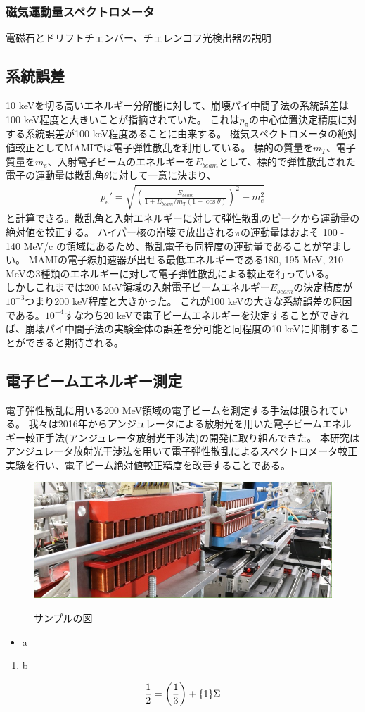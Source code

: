 \documentclass[a4paper,11pt,uplatex]{jsarticle}
\begin{document}
\subsubsection{磁気運動量スペクトロメータ}
電磁石とドリフトチェンバー、チェレンコフ光検出器の説明
\subsection{系統誤差}
10 keVを切る高いエネルギー分解能に対して、崩壊パイ中間子法の系統誤差は100 keV程度と大きいことが指摘されていた。
これは$p_\pi$の中心位置決定精度に対する系統誤差が100 keV程度あることに由来する。
磁気スペクトロメータの絶対値較正としてMAMIでは電子弾性散乱を利用している。
標的の質量を$m_T$、電子質量を$m_e$、入射電子ビームのエネルギーを$E_{beam}$として、標的で弾性散乱された電子の運動量は散乱角$\theta$に対して一意に決まり、
\begin{eqnarray}
  p_e' = \sqrt{\left(\frac{E_{beam}}{1 + E_{beam}/m_T(1 - \cos{\theta})} \right)^2 - m_e^2}
\end{eqnarray}
と計算できる。散乱角と入射エネルギーに対して弾性散乱のピークから運動量の絶対値を較正する。
ハイパー核の崩壊で放出される$\pi$の運動量はおよそ 100 - 140 MeV/c の領域にあるため、散乱電子も同程度の運動量であることが望ましい。
MAMIの電子線加速器が出せる最低エネルギーである180, 195 MeV, 210 MeVの3種類のエネルギーに対して電子弾性散乱による較正を行っている。\\
しかしこれまでは200 MeV領域の入射電子ビームエネルギー$E_{beam}$の決定精度が$10^{-3}$つまり200 keV程度と大きかった。
これが100 keVの大きな系統誤差の原因である。$10^{-4}$すなわち$20$ keVで電子ビームエネルギーを決定することができれば、崩壊パイ中間子法の実験全体の誤差を分可能と同程度の10 keVに抑制することができると期待される。
\subsection{電子ビームエネルギー測定}
電子弾性散乱に用いる200 MeV領域の電子ビームを測定する手法は限られている。
我々は2016年からアンジュレータによる放射光を用いた電子ビームエネルギー較正手法(アンジュレータ放射光干渉法)の開発に取り組んできた。
本研究はアンジュレータ放射光干渉法を用いて電子弾性散乱によるスペクトロメータ較正実験を行い、電子ビーム絶対値較正精度を改善することである。

\clearpage

\begin{figure}[tb]
  \centering
  \includegraphics[width=0.8\linewidth]{image/1-1.jpg}\\
  \caption{サンプルの図}
  \label{sample_image}
\end{figure}

\begin{itemize}
  \item a
\end{itemize}
\begin{enumerate}
  \item b
\end{enumerate}

\begin{align}
\frac{1}{2} = \qty(\frac{1}{3}) + \qty{1}\Sigma
\end{align}
\end{document}
